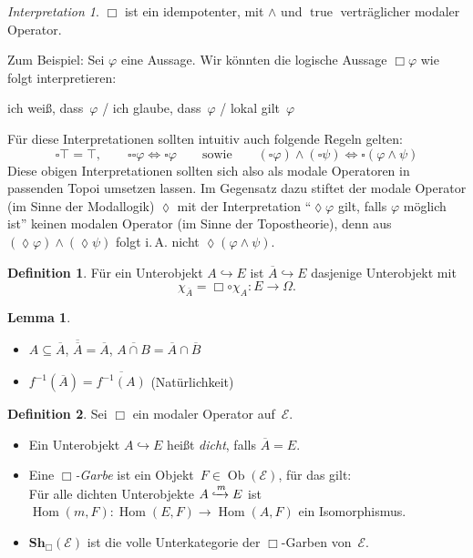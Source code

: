 \documentclass{article}
\theoremstyle{definition}
\newtheorem*{defn}{Definition}
\newtheorem*{lem}{Lemma}
\theoremstyle{remark}
\newtheorem*{interp}{Interpretation}
\newcommand{\?}{\,{:}\,}
\renewcommand{\_}{\mathpunct{.}\,}
\DeclareMathOperator{\Ob}{Ob} %
\DeclareMathOperator{\Hom}{Hom} %
\DeclareMathOperator{\true}{true} %
\newcommand{\clos}[1]{\overline{{#1}}} %
\newcommand{\Sh}{\mathbf{Sh}} %
\newcommand{\Eat}{\mathcal{E}} %
\begin{document}
\begin{interp}
  $\Box$ ist ein idempotenter, mit ${\wedge}$ und $\true$ verträglicher modaler Operator.

  Zum Beispiel: Sei $\varphi$ eine Aussage. Wir könnten die logische Aussage $\Box \varphi$ wie folgt interpretieren:
  \begin{center}
    ich weiß, dass~$\varphi$ / ich glaube, dass~$\varphi$ / lokal gilt~$\varphi$
  \end{center}
  Für diese Interpretationen sollten intuitiv auch folgende Regeln gelten:
  \[
    \square \top = \top, \qquad
    \square \square \varphi \iff \square \varphi
    \qquad \text{sowie} \qquad
    (\square \varphi) \wedge (\square \psi) \iff \square (\varphi \wedge \psi)
  \]
  Diese obigen Interpretationen sollten sich also als modale Operatoren in passenden Topoi umsetzen lassen.
  Im Gegensatz dazu stiftet der modale Operator (im Sinne der Modallogik) $\lozenge$ mit der Interpretation "`$\lozenge \varphi$ gilt, falls $\varphi$ möglich ist"' keinen modalen Operator (im Sinne der Topostheorie), denn aus $(\lozenge \varphi) \wedge (\lozenge \psi)$ folgt i.\,A. nicht $\lozenge (\varphi \wedge \psi)$.
\end{interp}

\begin{defn}
  Für ein Unterobjekt $A \hookrightarrow E$ ist $\clos{A} \hookrightarrow E$ dasjenige Unterobjekt mit
  \[ \chi_{\clos{A}} = \Box \circ \chi_A : E \to \Omega. \]
\end{defn}

\begin{lem}
  \begin{minipage}[t]{0.8 \linewidth}\begin{itemize}
    \item
      $A \subseteq \clos{A}$, \quad
      $\clos{\clos{A}} = \clos{A}$, \quad
      $\clos{A \cap B} = \clos{A} \cap \clos{B}$
    \item $f^{-1}(\clos{A}) = \clos{f^{-1}(A)}$ \enspace (Natürlichkeit) \qquad
  \end{itemize}\end{minipage}
\end{lem}

\begin{defn}
  Sei $\Box$ ein modaler Operator auf~$\Eat$.
  \begin{itemize}[itemsep=0pt]
    \item Ein Unterobjekt $A \hookrightarrow E$ heißt \emph{dicht}, falls $\clos{A} = E$.
    \item
      Eine \emph{$\Box$-Garbe} ist ein Objekt~$F \in \Ob(\Eat)$, für das gilt: \\
      Für alle dichten Unterobjekte $A \xhookrightarrow{m} E$ ist $\Hom(m, F) : \Hom(E, F) \to \Hom(A, F)$ ein Isomorphismus.
    \item $\Sh_\Box(\Eat)$ ist die volle Unterkategorie der $\Box$-Garben von~$\Eat$.
  \end{itemize}
\end{defn}
\end{document}
